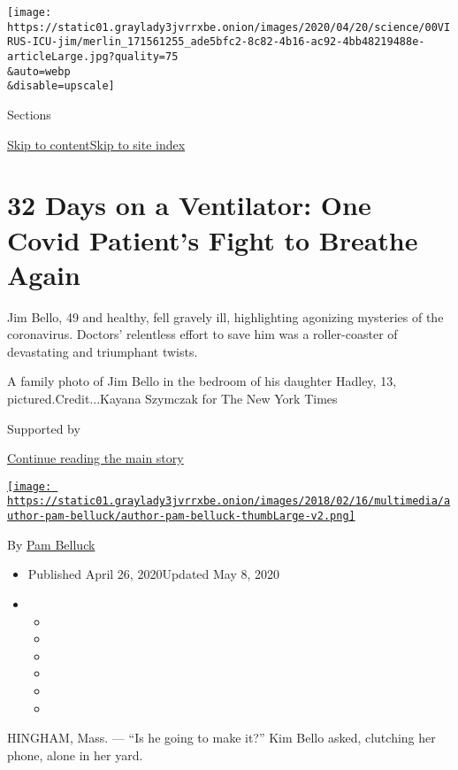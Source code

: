 \texttt{[image: https://static01.graylady3jvrrxbe.onion/images/2020/04/20/science/00VIRUS-ICU-jim/merlin\_171561255\_ade5bfc2-8c82-4b16-ac92-4bb48219488e-articleLarge.jpg?quality=75\\\&auto=webp\\\&disable=upscale]}

Sections

\protect\hyperlink{site-content}{Skip to
content}\protect\hyperlink{site-index}{Skip to site index}

\hypertarget{32-days-on-a-ventilator-one-covid-patients-fight-to-breathe-again}{%
\section{32 Days on a Ventilator: One Covid Patient's Fight to Breathe
Again}\label{32-days-on-a-ventilator-one-covid-patients-fight-to-breathe-again}}

Jim Bello, 49 and healthy, fell gravely ill, highlighting agonizing
mysteries of the coronavirus. Doctors' relentless effort to save him was
a roller-coaster of devastating and triumphant twists.

A family photo of Jim Bello in the bedroom of his daughter Hadley, 13,
pictured.Credit...Kayana Szymczak for The New York Times

Supported by

\protect\hyperlink{after-sponsor}{Continue reading the main story}

\href{https://www.nytimes3xbfgragh.onion/by/pam-belluck}{\texttt{[image: https://static01.graylady3jvrrxbe.onion/images/2018/02/16/multimedia/author-pam-belluck/author-pam-belluck-thumbLarge-v2.png]}}

By \href{https://www.nytimes3xbfgragh.onion/by/pam-belluck}{Pam Belluck}

\begin{itemize}
\item
  Published April 26, 2020Updated May 8, 2020
\item
  \begin{itemize}
  \item
  \item
  \item
  \item
  \item
  \item
  \end{itemize}
\end{itemize}

HINGHAM, Mass. --- ``Is he going to make it?'' Kim Bello asked,
clutching her phone, alone in her yard.

